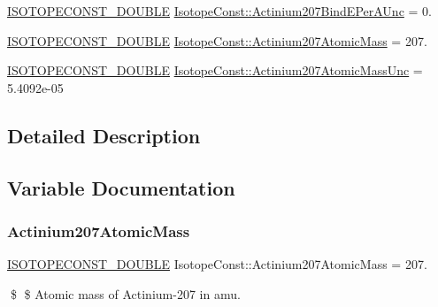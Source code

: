 \begin{DoxyCompactItemize}
\mbox{\hyperlink{group___isotope_const-_macros_ga8f45a7272ce02c0b4c65c44636ed719a}{I\+S\+O\+T\+O\+P\+E\+C\+O\+N\+S\+T\+\_\+\+D\+O\+U\+B\+LE}} \mbox{\hyperlink{group___isotope_const-_actinium-_ac207_ga00515e9729da0c2b4f658213f7a13392}{Isotope\+Const\+::\+Actinium207\+Bind\+E\+Per\+A\+Unc}} = 0.
\item 
\mbox{\hyperlink{group___isotope_const-_macros_ga8f45a7272ce02c0b4c65c44636ed719a}{I\+S\+O\+T\+O\+P\+E\+C\+O\+N\+S\+T\+\_\+\+D\+O\+U\+B\+LE}} \mbox{\hyperlink{group___isotope_const-_actinium-_ac207_ga7edb085659c0d8fb7c7406ac70212f52}{Isotope\+Const\+::\+Actinium207\+Atomic\+Mass}} = 207.
\item 
\mbox{\hyperlink{group___isotope_const-_macros_ga8f45a7272ce02c0b4c65c44636ed719a}{I\+S\+O\+T\+O\+P\+E\+C\+O\+N\+S\+T\+\_\+\+D\+O\+U\+B\+LE}} \mbox{\hyperlink{group___isotope_const-_actinium-_ac207_ga51163970919e1923a20b18bda25d7508}{Isotope\+Const\+::\+Actinium207\+Atomic\+Mass\+Unc}} = 5.\+4092e-\/05
\end{DoxyCompactItemize}


\subsection{Detailed Description}


\subsection{Variable Documentation}
\mbox{\label{group___isotope_const-_actinium-_ac207_ga7edb085659c0d8fb7c7406ac70212f52}} 
\subsubsection{\texorpdfstring{Actinium207\+Atomic\+Mass}{Actinium207AtomicMass}}
{\footnotesize\ttfamily \mbox{\hyperlink{group___isotope_const-_macros_ga8f45a7272ce02c0b4c65c44636ed719a}{I\+S\+O\+T\+O\+P\+E\+C\+O\+N\+S\+T\+\_\+\+D\+O\+U\+B\+LE}} Isotope\+Const\+::\+Actinium207\+Atomic\+Mass = 207.}

\$ \$ Atomic mass of Actinium-\/207 in amu. \mbox{\label{group___isotope_const-_actinium-_ac207_ga51163970919e1923a20b18bda25d7508}} 
